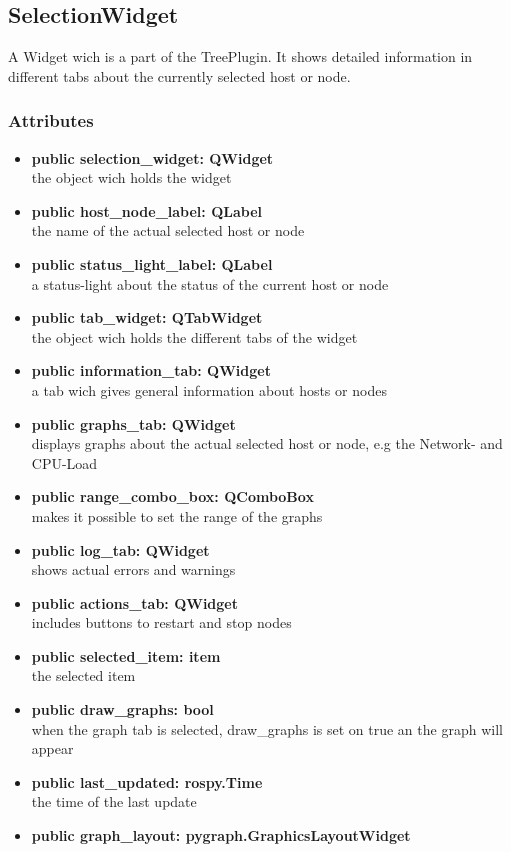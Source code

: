 \subsection{SelectionWidget}
A Widget wich is a part of the TreePlugin. It shows detailed information
in different tabs about the currently selected host or node.
\subsubsection{Attributes}
\begin{itemize}
  \item \textbf{public selection\_widget: QWidget}\\
  the object wich holds the widget
  \item \textbf{public host\_node\_label: QLabel}\\
  the name of the actual selected host or node
  \item \textbf{public status\_light\_label: QLabel}\\
  a status-light about the status of the current host or node
  \item \textbf{public tab\_widget: QTabWidget}\\
  the object wich holds the different tabs of the widget
  \item \textbf{public information\_tab: QWidget}\\
  a tab wich gives general information about hosts or nodes 
  \item \textbf{public graphs\_tab: QWidget}\\
  displays graphs about the actual selected host or node, e.g the Network- and
  CPU-Load
  \item \textbf{public range\_combo\_box: QComboBox}\\
  makes it possible to set the range of the graphs
  \item \textbf{public log\_tab: QWidget}\\
  shows actual errors and warnings
  \item \textbf{public actions\_tab: QWidget}\\
  includes buttons to restart and stop nodes
  \item \textbf{public selected\_item: item}\\
  the selected item
  \item \textbf{public draw\_graphs: bool}\\
  when the graph tab is selected, draw\_graphs is set on true an the graph will
  appear
  \item \textbf{public last\_updated: rospy.Time}\\
  the time of the last update
  \item \textbf{public graph\_layout: pygraph.GraphicsLayoutWidget}\\
  

\end{itemize}
